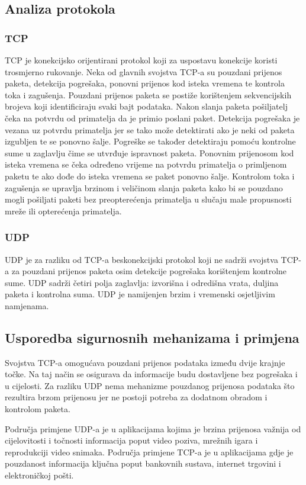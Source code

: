 \documentclass[times, utf8, diplomski]{fer}
\begin{document}
\subsection{Analiza protokola}
\subsubsection{TCP}
TCP je konekcijsko orijentirani protokol koji za uspostavu konekcije koristi trosmjerno rukovanje. Neka od glavnih svojstva TCP-a su pouzdani prijenos paketa, detekcija pogrešaka, ponovni prijenos kod isteka vremena te kontrola toka i zagušenja. Pouzdani prijenos paketa se postiže korištenjem sekvencijskih brojeva koji identificiraju svaki bajt podataka. Nakon slanja paketa pošiljatelj čeka na potvrdu od primatelja da je primio poslani paket. Detekcija pogrešaka je vezana uz potvrdu primatelja jer se tako može detektirati ako je neki od paketa izgubljen te se ponovno šalje. Pogreške se također detektiraju pomoću kontrolne sume u zaglavlju čime se utvrđuje ispravnost paketa. Ponovnim prijenosom kod isteka vremena se čeka određeno vrijeme na potvrdu primatelja o primljenom paketu te ako dođe do isteka vremena se paket ponovno šalje. Kontrolom toka i zagušenja se upravlja brzinom i veličinom slanja paketa kako bi se pouzdano mogli pošiljati paketi bez preopterećenja primatelja u slučaju male propusnosti mreže ili opterećenja primatelja.

\subsubsection{UDP}
UDP je za razliku od TCP-a beskonekcijski protokol koji ne sadrži svojstva TCP-a za pouzdani prijenos paketa osim detekcije pogrešaka korištenjem kontrolne sume. UDP sadrži četiri polja zaglavlja: izvorišna i odredišna vrata, duljina paketa i kontrolna suma. UDP je namijenjen brzim i vremenski osjetljivim namjenama.

\subsection{Usporedba sigurnosnih mehanizama i primjena}
Svojstva TCP-a omogućava pouzdani prijenos podataka između dvije krajnje točke. Na taj način se osigurava da informacije budu dostavljene bez pogrešaka i u cijelosti. Za razliku UDP nema mehanizme pouzdanog prijenosa podataka što rezultira brzom prijenosu jer ne postoji potreba za dodatnom obradom i kontrolom paketa. 

Područja primjene UDP-a je u aplikacijama kojima je brzina prijenosa važnija od cijelovitosti i točnosti informacija poput video poziva, mrežnih igara i reprodukciji video snimaka. Područja primjene TCP-a je u aplikacijama gdje je pouzdanost informacija ključna poput bankovnih sustava, internet trgovini i elektroničkoj pošti.
\end{document}
